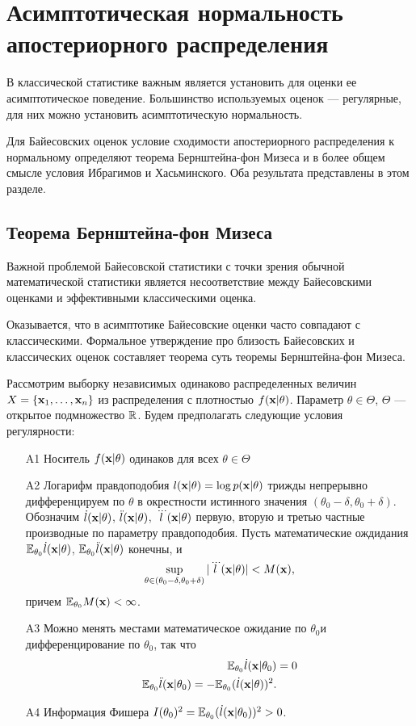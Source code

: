 \section{Асимптотическая нормальность апостериорного распределения}

В классической статистике важным является установить для оценки ее асимптотическое поведение.
Большинство используемых оценок --- регулярные, для них
можно установить асимптотическую нормальность.

Для Байесовских оценок условие сходимости апостериорного распределения к нормальному определяют теорема Бернштейна-фон Мизеса и в более общем смысле условия Ибрагимов и Хасьминского.
Оба результата представлены в этом разделе.


\subsection{Теорема Бернштейна-фон Мизеса}

Важной проблемой Байесовской статистики с точки зрения обычной математической статистики является несоответствие между Байесовскими оценками и эффективными классическими оценка.

Оказывается, что в асимптотике Байесовские оценки часто совпадают с классическими.
Формальное утверждение про близость Байесовских и классических оценок 
составляет теорема суть теоремы Бернштейна-фон Мизеса.

Рассмотрим выборку независимых одинаково распределенных величин $X = \{\mathbf{x}_1, \ldots, \mathbf{x}_{n} \}$ из распределения с плотностью $f(\mathbf{x} | \theta)$. 
Параметр $\theta \in \Theta$, $\Theta$ --- открытое подмножество $\mathbb{R}$.
Будем предполагать следующие условия регулярности:
\begin{itemize}
	\item[A1] Носитель $f(\mathbf{x} | \theta)$ одинаков для всех $\theta \in \Theta$
	\item[A2] Логарифм правдоподобия $l(\mathbf{x} | \theta) = \log p(\mathbf{x} | \theta)$ трижды непрерывно дифференцируем по $\theta$ в окрестности истинного значения $(\theta_0 - \delta, \theta_0 + \delta)$. Обозначим $\dot{l}(\mathbf{x} | \theta)$,
	$\ddot{l}(\mathbf{x} | \theta)$, $\dddot{l}(\mathbf{x} | \theta)$ первую, вторую и третью частные производные по параметру правдоподобия. Пусть математические ождидания $\mathbb{E}_{\theta_0} \dot{l}(\mathbf{x} | \theta)$, 
	$\mathbb{E}_{\theta_0} \ddot{l}(\mathbf{x} | \theta)$ конечны, и
	\[
	\sup_{\theta \in (\theta_0 - \delta, \theta_0 + \delta)} |\dddot{l}(\mathbf{x} | \theta)| < M(\mathbf{x}),
	\]
	причем $\mathbb{E}_{\theta_0} M(\mathbf{x}) < \infty$.
	\item[A3] Можно менять местами математическое ожидание по $\theta_0$и дифференцирование по $\theta_0$, так что
	\begin{align*}
	\mathbb{E}_{\theta_0} \dot{l}(\mathbf{x} | \theta_0) &= 0 \\
	\mathbb{E}_{\theta_0} \ddot{l}(\mathbf{x} | \theta_0) = - \mathbb{E}_{\theta_0} (\dot{l}(\mathbf{x} | \theta))^2.
	\end{align*}
	\item[A4] Информация Фишера $I(\theta_0)^2 = \mathbb{E}_{\theta_0} (\dot{l}(\mathbf{x} | \theta_0))^2 > 0$.
\end{itemize}

